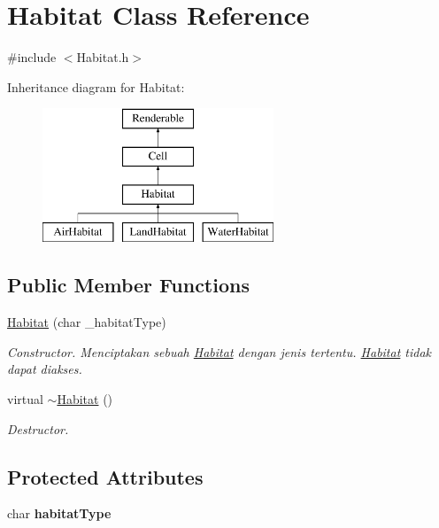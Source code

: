 \hypertarget{classHabitat}{\section{Habitat Class Reference}
\label{classHabitat}
}


{\ttfamily \#include $<$Habitat.\+h$>$}

Inheritance diagram for Habitat\+:\begin{figure}[H]
\begin{center}
\leavevmode
\includegraphics[height=4.000000cm]{classHabitat}
\end{center}
\end{figure}
\subsection*{Public Member Functions}
\begin{DoxyCompactItemize}
\item 
\hyperlink{classHabitat_ac227e66c09b35766737201b623fb7066}{Habitat} (char \+\_\+habitat\+Type)
\begin{DoxyCompactList}\small\item\em Constructor. Menciptakan sebuah \hyperlink{classHabitat}{Habitat} dengan jenis tertentu. \hyperlink{classHabitat}{Habitat} tidak dapat diakses. \end{DoxyCompactList}\item 
\hypertarget{classHabitat_afd413e46df54891b04262872f04b314f}{virtual \hyperlink{classHabitat_afd413e46df54891b04262872f04b314f}{$\sim$\+Habitat} ()}\label{classHabitat_afd413e46df54891b04262872f04b314f}

\begin{DoxyCompactList}\small\item\em Destructor. \end{DoxyCompactList}\end{DoxyCompactItemize}
\subsection*{Protected Attributes}
\begin{DoxyCompactItemize}
\item 
\hypertarget{classHabitat_a317eb1973b2d0702a78a1fdd3041c959}{char {\bfseries habitat\+Type}}\label{classHabitat_a317eb1973b2d0702a78a1fdd3041c959}

\end{DoxyCompactItemize}


